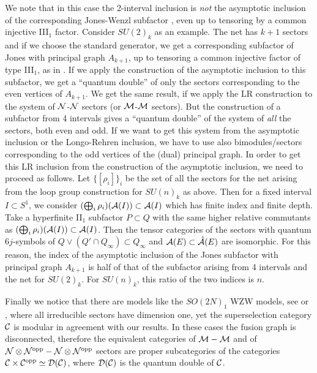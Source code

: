\documentclass[12pt]{article}
\def\o{{\rm opp}}
\def\2#1{{\cal #1}}
\def\A{{\cal A}}
\def\D{{\cal D}}
\def\N{{\cal N}}
\def\M{{\cal M}}
\begin{document}
We note  that in this case the 2-interval inclusion is {\it not}
the asymptotic inclusion of the corresponding
Jones-Wenzl subfactor \cite{J,We}, even up to tensoring
by a common injective III$_1$ factor.  Consider $SU(2)_k$
as an example.  The net has $k+1$ sectors and if we choose
the standard generator, we get a corresponding
subfactor of Jones with
principal graph $A_{k+1}$, up to tensoring a common
injective factor of type III$_1$, as in \cite{W}.
If we apply the construction of the asymptotic inclusion to
this subfactor, we get a ``quantum double'' of only the
sectors corresponding to the even vertices of $A_{k+1}$.
We get the same result, if we apply the LR construction
to the system of $\N$-$\N$ sectors (or $\M$-$\M$ sectors).
But the construction of a subfactor from 4 intervals gives
a ``quantum double'' of the system of
{\it all} the sectors, both even and odd.  If we want to
get this system from the asymptotic inclusion or the
Longo-Rehren inclusion, we have to use also bimodules/sectors
corresponding to the odd vertices of the (dual) principal graph.
In order to get this LR inclusion from
the construction of the asymptotic inclusion, we need to proceed
as follows.  Let $\{[\rho_i]\}_i$ be the set of all the
sectors for the net arising from the loop group construction
for $SU(n)_k$ as above.
Then for a fixed interval $I\subset S^1$, we consider
$(\bigoplus_i \rho_i)(\A(I))\subset \A(I)$ which has finite index
and finite depth.  Take a hyperfinite II$_1$ subfactor
$P\subset Q$ with the same higher relative commutants as
$(\bigoplus_i \rho_i)(\A(I))\subset \A(I)$.  Then the tensor
categories of the sectors with quantum $6j$-symbols of
$Q\vee(Q'\cap Q_\infty)\subset Q_\infty$ and $\A(E)\subset \hat \A(E)$
are isomorphic.
For this reason,
the index of the asymptotic inclusion of the Jones subfactor
with principal graph $A_{k+1}$
is half of that of the subfactor arising from 4 intervals
and the net for $SU(2)_k$.  For $SU(n)_k$, this ratio of the two
indices is $n$.
\smallskip

Finally we notice that there are models like the $SO(2N)_1$ WZW models,
see \cite{BO} or \cite{Mu4}, where all irreducible sectors have dimension
one, yet the superselection category $\2C$ is modular in agreement with our
results.
In these cases the fusion graph is disconnected, therefore the equivalent
categories of $\M-\M$ and of $\N\otimes\N^\o-\N\otimes\N^\o$ sectors are
proper subcategories of the categories $\2C\times\2C^\o\simeq\D(\2C)$, where
$\D(\2C)$ is the quantum double of $\2C$.
\smallskip
\end{document}
